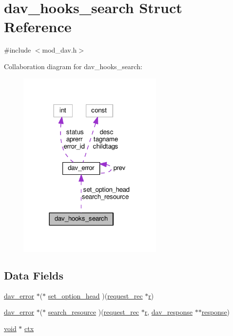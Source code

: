 \hypertarget{structdav__hooks__search}{}\section{dav\+\_\+hooks\+\_\+search Struct Reference}
\label{structdav__hooks__search}


{\ttfamily \#include $<$mod\+\_\+dav.\+h$>$}



Collaboration diagram for dav\+\_\+hooks\+\_\+search\+:
\nopagebreak
\begin{figure}[H]
\begin{center}
\leavevmode
\includegraphics[width=204pt]{structdav__hooks__search__coll__graph}
\end{center}
\end{figure}
\subsection*{Data Fields}
\begin{DoxyCompactItemize}
\item 
\hyperlink{structdav__error}{dav\+\_\+error} $\ast$($\ast$ \hyperlink{structdav__hooks__search_a641fc2e2c2298ac248e60f8a3737ad97}{set\+\_\+option\+\_\+head} )(\hyperlink{structrequest__rec}{request\+\_\+rec} $\ast$\hyperlink{pcregrep_8txt_a2e9e9438b26c0bb4425367a7e4f75eb3}{r})
\item 
\hyperlink{structdav__error}{dav\+\_\+error} $\ast$($\ast$ \hyperlink{structdav__hooks__search_ab103e08ba5a91b0efe84de88ccb93cd6}{search\+\_\+resource} )(\hyperlink{structrequest__rec}{request\+\_\+rec} $\ast$\hyperlink{pcregrep_8txt_a2e9e9438b26c0bb4425367a7e4f75eb3}{r}, \hyperlink{structdav__response}{dav\+\_\+response} $\ast$$\ast$\hyperlink{group__MOD__DAV_ga61a23706db0e2c726e15a7a081345de7}{response})
\item 
\hyperlink{group__MOD__ISAPI_gacd6cdbf73df3d9eed42fa493d9b621a6}{void} $\ast$ \hyperlink{structdav__hooks__search_a67f25880175eb88d81064560562e96ee}{ctx}
\end{DoxyCompactItemize}



